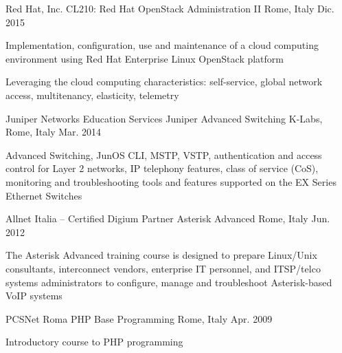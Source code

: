 \begin{cventries}

	\cventry
	{Red Hat, Inc.} %
	{CL210: Red Hat OpenStack Administration II} %
	{Rome, Italy} %
	{Dic. 2015} %
	{ %
		\begin{cvitems}
			\item {Implementation, configuration, use and maintenance of a cloud computing environment using Red Hat Enterprise Linux OpenStack platform}
			\item {Leveraging the cloud computing characteristics: self-service, global network access, multitenancy, elasticity, telemetry}
		\end{cvitems}
	}


	\cventry
	{Juniper Networks Education Services} %
	{Juniper Advanced Switching} %
	{K-Labs, Rome, Italy} %
	{Mar. 2014} %
	{ %
		\begin{cvitems}
			\item {Advanced Switching, JunOS CLI, MSTP, VSTP, authentication and access control for Layer 2 networks, IP telephony features, class of service (CoS), monitoring and troubleshooting tools and features supported on the EX Series Ethernet Switches}
		\end{cvitems}
	}

	

	\cventry
	{Allnet Italia – Certified Digium Partner} %
	{Asterisk Advanced} %
	{Rome, Italy} %
	{Jun. 2012} %
	{ %
		\begin{cvitems}
			\item {The Asterisk Advanced training course is designed to prepare Linux/Unix consultants, interconnect vendors, enterprise IT personnel, and ITSP/telco systems administrators to configure, manage and troubleshoot Asterisk-based VoIP systems}
		\end{cvitems}
	}


	\cventry
	{PCSNet Roma} %
	{PHP Base Programming} %
	{Rome, Italy} %
	{Apr. 2009} %
	{ %
		\begin{cvitems}
			\item {Introductory course to PHP programming}
		\end{cvitems}
	}


\end{cventries}
